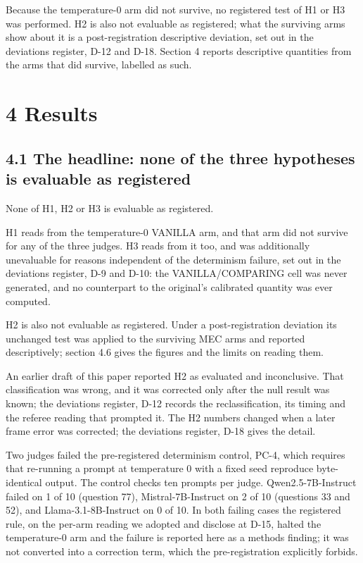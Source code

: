 Because the temperature-0 arm did not survive, no registered test of H1 or H3 was performed. H2 is also not evaluable as registered; what the surviving arms show about it is a post-registration descriptive deviation, set out in the deviations register, D-12 and D-18. Section
4 reports descriptive quantities from the arms that did survive, labelled as such.

\section{4 Results}\label{results}

\subsection{4.1 The headline: none of the three hypotheses is evaluable as registered}\label{the-headline-none-of-the-three-hypotheses-is-evaluable-as-registered}

None of H1, H2 or H3 is evaluable as registered.

H1 reads from the temperature-0 VANILLA arm, and that arm did not survive for any of the three
judges. H3 reads from it too, and was additionally unevaluable for reasons independent of the
determinism failure, set out in the deviations register, D-9 and D-10: the VANILLA/COMPARING cell was never
generated, and no counterpart to the original's calibrated quantity was ever computed.

H2 is also not evaluable as registered. Under a post-registration deviation its unchanged test
was applied to the surviving MEC arms and reported descriptively; section 4.6 gives the figures
and the limits on reading them.

An earlier draft of this paper reported H2 as evaluated and inconclusive. That classification was
wrong, and it was corrected only after the null result was known; the deviations register, D-12 records the
reclassification, its timing and the referee reading that prompted it. The H2 numbers changed when a later frame error was corrected; the deviations register, D-18 gives the detail.

Two judges failed the pre-registered determinism control, PC-4, which requires that re-running a
prompt at temperature 0 with a fixed seed reproduce byte-identical output. The control checks ten
prompts per judge. Qwen2.5-7B-Instruct failed on 1 of 10 (question 77), Mistral-7B-Instruct on
2 of 10 (questions 33 and 52), and Llama-3.1-8B-Instruct on 0 of 10. In both failing cases the
registered rule, on the per-arm reading we adopted and disclose at D-15, halted the temperature-0
arm and the failure is reported here as a methods finding;
it was not converted into a correction term, which the pre-registration explicitly forbids.


